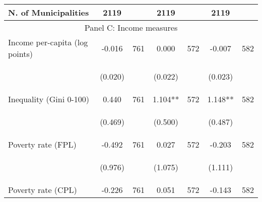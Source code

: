 \begin{tabular}{lcccccc}
N. of Municipalities  &   2119   &  &  2119    & &  2119  &    \\

\hline		

\multicolumn{7}{c}{Panel C: Income measures} \\

Income per-capita (log points)    &  -0.016   &  761  &   0.000  &  572 &  -0.007  &  582   \\

\vspace{4pt} &  \begin{footnotesize}(0.020)\end{footnotesize}   & &
			    \begin{footnotesize}(0.022)\end{footnotesize}   & &
			    \begin{footnotesize}(0.023)\end{footnotesize}   &
			     \\          


Inequality (Gini 0-100)     &  0.440   &  761  &   1.104**  &  572 &  1.148**  &  582   \\

\vspace{4pt} &  \begin{footnotesize}(0.469)\end{footnotesize}   & &
			    \begin{footnotesize}(0.500)\end{footnotesize}   & &
			    \begin{footnotesize}(0.487)\end{footnotesize}   &
			     \\


Poverty rate (FPL)     &  -0.492   &  761  &   0.027  &  572 &  -0.203  &  582   \\

\vspace{4pt} &  \begin{footnotesize}(0.976)\end{footnotesize}   & &
			    \begin{footnotesize}(1.075)\end{footnotesize}   & &
			    \begin{footnotesize}(1.111)\end{footnotesize}   &
			     \\
 
Poverty rate (CPL)    &  -0.226   &  761  &   0.051  &  572 &  -0.143  &  582   \\


\end{tabular}
